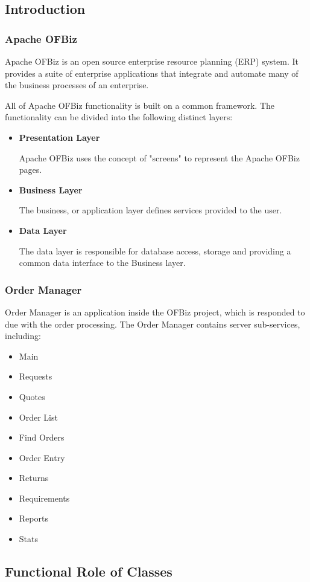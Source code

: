 \documentclass[a4paper,11pt]{article}
\begin{document}
	\subsection{Introduction}
	\subsubsection{Apache OFBiz}
	Apache OFBiz is an open source enterprise resource planning (ERP) system. It provides a suite of enterprise applications that integrate and automate many of the business processes of an enterprise.
	
	All of Apache OFBiz functionality is built on a common framework. The functionality can be divided into the following distinct layers:
	\begin{itemize}
		\item \textbf{Presentation Layer}
		
		Apache OFBiz uses the concept of "screens" to represent the Apache OFBiz pages. 
		\item \textbf{Business Layer}
		
		The business, or application layer defines services provided to the user.
		\item \textbf{Data Layer}
		
		The data layer is responsible for database access, storage and providing a common data interface to the Business layer. 
	\end{itemize}
	\subsubsection{Order Manager}
	Order Manager is an application inside the OFBiz project, which is responded to due with the order processing. The Order Manager contains server sub-services, including:
	\begin{itemize}
		\item Main
		\item Requests
		\item Quotes
		\item Order List
		\item Find Orders
		\item Order Entry
		\item Returns
		\item Requirements
		\item Reports
		\item Stats
	\end{itemize}	
	\subsection{Functional Role of Classes}	
\end{document}
